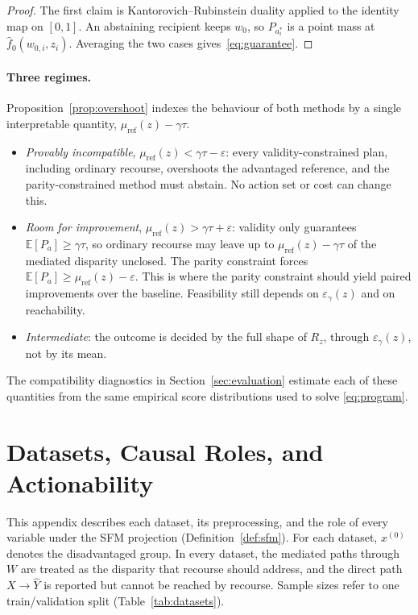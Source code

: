 \begin{proof}
The first claim is Kantorovich--Rubinstein duality applied to the identity map
on $[0,1]$. An abstaining recipient keeps $w_0$, so $P_{a^*_i}$ is a point mass
at $\hat f_0(w_{0,i},z_i)$. Averaging the two cases gives~\eqref{eq:guarantee}.
\end{proof}

\paragraph{Three regimes.}
Proposition~\ref{prop:overshoot} indexes the behaviour of both methods by a
single interpretable quantity, $\mu_{\mathrm{ref}}(z)-\gamma\tau$.
\begin{itemize}[nosep]
  \item \emph{Provably incompatible}, $\mu_{\mathrm{ref}}(z)<\gamma\tau-\varepsilon$:
        every validity-constrained plan, including ordinary recourse, overshoots
        the advantaged reference, and the parity-constrained method must abstain.
        No action set or cost can change this.
  \item \emph{Room for improvement}, $\mu_{\mathrm{ref}}(z)>\gamma\tau+\varepsilon$:
        validity only guarantees $\mathbb E[P_a]\ge\gamma\tau$, so ordinary
        recourse may leave up to $\mu_{\mathrm{ref}}(z)-\gamma\tau$ of the mediated
        disparity unclosed. The parity constraint forces
        $\mathbb E[P_a]\ge\mu_{\mathrm{ref}}(z)-\varepsilon$. This is where the
        parity constraint should yield paired improvements over the baseline.
        Feasibility still depends on $\varepsilon_\gamma(z)$ and on reachability.
  \item \emph{Intermediate}: the outcome is decided by the full shape of
        $R_z$, through $\varepsilon_\gamma(z)$, not by its mean.
\end{itemize}
The compatibility diagnostics in Section~\ref{sec:evaluation} estimate each of
these quantities from the same empirical score distributions used to solve
\eqref{eq:program}.

\section{Datasets, Causal Roles, and Actionability}
\label{app:data}

This appendix describes each dataset, its preprocessing, and the role of
every variable under the SFM projection (Definition~\ref{def:sfm}). For each
dataset, $x^{(0)}$ denotes the disadvantaged group. In every dataset, the
mediated paths through $W$ are treated as the disparity that recourse should
address, and the direct path $X\to\hat Y$ is reported but cannot be reached
by recourse. Sample sizes refer to one train/validation split
(Table~\ref{tab:datasets}).


